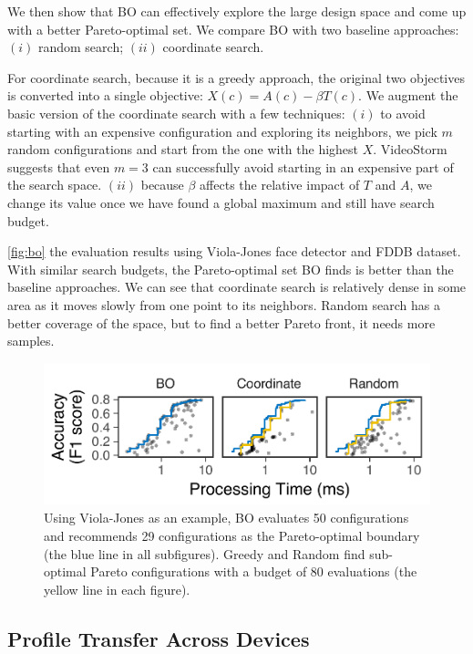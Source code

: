 

We then show that BO can effectively explore the large design space and come up
with a better Pareto-optimal set. We compare BO with two baseline approaches:
$(i)$ random search; $(ii)$ coordinate search.

For coordinate search, because it is a greedy approach, the original two
objectives is converted into a single objective: $X(c) = A(c) - \beta T(c)$. We
augment the basic version of the coordinate search with a few techniques: $(i)$
to avoid starting with an expensive configuration and exploring its neighbors,
we pick $m$ random configurations and start from the one with the highest
$X$. VideoStorm~\cite{zhang2017live} suggests that even $m = 3$ can successfully
avoid starting in an expensive part of the search space. $(ii)$ because $\beta$
affects the relative impact of $T$ and $A$, we change its value once we have
found a global maximum and still have search budget.

\autoref{fig:bo} the evaluation results using Viola-Jones face detector and FDDB
dataset. With similar search budgets, the Pareto-optimal set BO finds is better
than the baseline approaches. We can see that coordinate search is relatively
dense in some area as it moves slowly from one point to its neighbors. Random
search has a better coverage of the space, but to find a better Pareto front, it
needs more samples.

\begin{figure}
  \centering
  \includegraphics[width=0.85\columnwidth]{figures/bo-eval.pdf}
  \caption{Using Viola-Jones as an example, BO evaluates 50 configurations and
    recommends 29 configurations as the Pareto-optimal boundary (the blue line
    in all subfigures). Greedy and Random find sub-optimal Pareto configurations
    with a budget of 80 evaluations (the yellow line in each figure).}
  \label{fig:bo}
\end{figure}

\subsection{Profile Transfer Across Devices}
\label{sec:performance-transfer}

